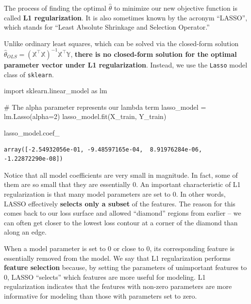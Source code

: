 \documentclass[
  letterpaper,
  DIV=11,
  numbers=noendperiod]{scrreprt}
\newenvironment{Shaded}{\begin{snugshade}}{\end{snugshade}}
\newcommand{\CommentTok}[1]{\textcolor[rgb]{0.37,0.37,0.37}{#1}}
\newcommand{\DecValTok}[1]{\textcolor[rgb]{0.68,0.00,0.00}{#1}}
\newcommand{\ImportTok}[1]{\textcolor[rgb]{0.00,0.46,0.62}{#1}}
\newcommand{\NormalTok}[1]{\textcolor[rgb]{0.00,0.23,0.31}{#1}}
\newcommand{\OperatorTok}[1]{\textcolor[rgb]{0.37,0.37,0.37}{#1}}
\begin{document}
The process of finding the optimal \(\hat{\theta}\) to minimize our new
objective function is called \textbf{L1 regularization}. It is also
sometimes known by the acronym ``LASSO'', which stands for ``Least
Absolute Shrinkage and Selection Operator.''

Unlike ordinary least squares, which can be solved via the closed-form
solution
\(\hat{\theta}_{OLS} = (\mathbb{X}^{\top}\mathbb{X})^{-1}\mathbb{X}^{\top}\mathbb{Y}\),
\textbf{there is no closed-form solution for the optimal parameter
vector under L1 regularization}. Instead, we use the \texttt{Lasso}
model class of \texttt{sklearn}.

\begin{Shaded}
\begin{Highlighting}[]
\ImportTok{import}\NormalTok{ sklearn.linear\_model }\ImportTok{as}\NormalTok{ lm}

\CommentTok{\# The alpha parameter represents our lambda term}
\NormalTok{lasso\_model }\OperatorTok{=}\NormalTok{ lm.Lasso(alpha}\OperatorTok{=}\DecValTok{2}\NormalTok{)}
\NormalTok{lasso\_model.fit(X\_train, Y\_train)}

\NormalTok{lasso\_model.coef\_}
\end{Highlighting}
\end{Shaded}

\begin{verbatim}
array([-2.54932056e-01, -9.48597165e-04,  8.91976284e-06, -1.22872290e-08])
\end{verbatim}

Notice that all model coefficients are very small in magnitude. In fact,
some of them are so small that they are essentially 0. An important
characteristic of L1 regularization is that many model parameters are
set to 0. In other words, LASSO effectively \textbf{selects only a
subset} of the features. The reason for this comes back to our loss
surface and allowed ``diamond'' regions from earlier -- we can often get
closer to the lowest loss contour at a corner of the diamond than along
an edge.

When a model parameter is set to 0 or close to 0, its corresponding
feature is essentially removed from the model. We say that L1
regularization performs \textbf{feature selection} because, by setting
the parameters of unimportant features to 0, LASSO ``selects'' which
features are more useful for modeling. L1 regularization indicates that
the features with non-zero parameters are more informative for modeling
than those with parameters set to zero.
\end{document}
